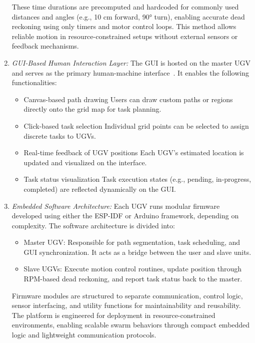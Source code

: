 \documentclass[conference]{IEEEtran}
\begin{document}
\begin{enumerate}
These time durations are precomputed and hardcoded for commonly used distances and angles (e.g., 10 cm forward, 90° turn), enabling accurate dead reckoning using only timers and motor control loops. This method allows reliable motion in resource-constrained setups without external sensors or feedback mechanisms.

\item {\em GUI-Based Human Interaction Layer: }
\label{subsec:3.6}
The GUI is hosted on the master UGV and serves as the primary human-machine interface~\cite{randomnerd2024esp32}. It enables the following functionalities:
\begin{itemize}
    \item Canvas-based path drawing Users can draw custom paths or regions directly onto the grid map for task planning.
    \item Click-based task selection Individual grid points can be selected to assign discrete tasks to UGVs.
    \item Real-time feedback of UGV positions Each UGV's estimated location is updated and visualized on the interface.
    \item Task status visualization Task execution states (e.g., pending, in-progress, completed) are reflected dynamically on the GUI.
\end{itemize}

\item {\em Embedded Software Architecture: }
Each UGV runs modular firmware developed using either the ESP-IDF or Arduino framework, depending on complexity. The software architecture is divided into:
\begin{itemize}
    \item {Master UGV:} Responsible for path segmentation, task scheduling, and GUI synchronization. It acts as a bridge between the user and slave units.
    \item {Slave UGVs:} Execute motion control routines, update position through RPM-based dead reckoning, and report task status back to the master.
\end{itemize}

Firmware modules are structured to separate communication, control logic, sensor interfacing, and utility functions for maintainability and reusability. The platform is engineered for deployment in resource-constrained environments, enabling scalable swarm behaviors through compact embedded logic and lightweight communication protocols.


\end{enumerate}
\end{document}

